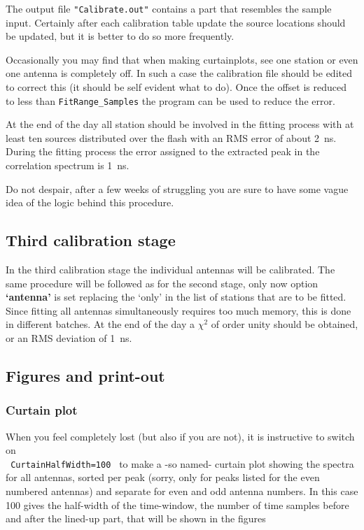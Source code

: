 The output file \verb!"Calibrate.out"! contains a part that resembles the sample input. Certainly after each calibration table update the source locations should be updated, but it is better to do so more frequently.

Occasionally you may find that when making curtainplots, see  one station or even one antenna is completely off. In such a case the calibration file should be edited to correct this (it should be self evident what to do). Once the offset is reduced to less than \verb!FitRange_Samples! the program can be used to reduce the error.

At the end of the day all station should be involved in the fitting process with at least ten sources distributed over the flash with an RMS error of about 2~ns. During the fitting process the error assigned to the extracted peak in the correlation spectrum is 1~ns.

Do not despair, after a few weeks of struggling you are sure to have some vague idea of the logic behind this procedure.

\subsection{Third calibration stage}

In the third calibration stage the individual antennas will be calibrated. The same procedure will be followed as for the second stage, only now option {\bf `antenna'} is set replacing the `only' in the list of stations that are to be fitted. Since fitting all antennas simultaneously requires too much memory, this is done in different batches. At the end of the day a $\chi^2$ of order unity should be obtained, or an RMS deviation of 1~ns.

\subsection{Figures and print-out}

\subsubsection{Curtain plot}

When you feel completely lost (but also if you are not), it is instructive to switch on \\\verb! CurtainHalfWidth=100 ! to make a -so named- curtain plot showing the spectra for all antennas, sorted per peak (sorry, only for peaks listed for the even numbered antennas) and separate for even and odd antenna numbers. In this case 100 gives the half-width of the time-window, the number of time samples before and after the lined-up part, that will be shown in the figures

